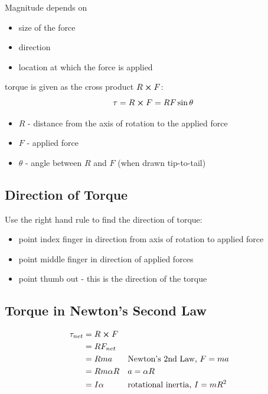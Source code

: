 \documentclass[titlepage]{article}
\begin{document}
Magnitude depends on
\begin{itemize}
    \item size of the force
    \item direction
    \item location at which the force is applied
\end{itemize}

torque is given as the cross product $R \cross F$:
\begin{equation*}
    \tau = R \cross F = RF \sin \theta
\end{equation*}

\begin{itemize}
    \item $R$ - distance from the axis of rotation to the applied force
    \item $F$ - applied force
    \item $\theta$ - angle between $R$ and $F$ (when drawn tip-to-tail)
\end{itemize}

\subsection{Direction of Torque}
Use the right hand rule to find the direction of torque:
\begin{itemize}
    \item point index finger in direction from axis of rotation to applied force
    \item point middle finger in direction of applied forces
    \item point thumb out - this is the direction of the torque
\end{itemize}

\subsection{Torque in Newton's Second Law}
\begin{align*}
    \tau_{net} & = R \cross F                                            \\
               & = R F_{net}                                             \\
               & = Rma         &  & \text{Newton's 2nd Law, } F = ma     \\
               & = Rm \alpha R &  & a = \alpha R                         \\
               & = I \alpha    &  & \text{rotational inertia, } I = mR^2
\end{align*}
\end{document}
